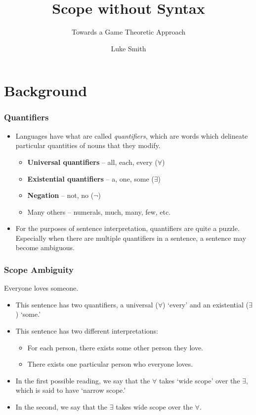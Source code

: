 \documentclass[aspectratio=1610]{beamer}
\title{Scope without Syntax}
\subtitle{Towards a Game Theoretic Approach}
\author{Luke Smith}
\institute{Committee: Robert, MPP, TgB}
\begin{document}

\begin{frame}
\titlepage
\end{frame}

\section{Background}

\begin{frame}
\frametitle{Quantifiers}\pause
\begin{itemize}
\item Languages have what are called \emph{quantifiers}, which are words which delineate particular quantities of nouns that they modify.\pause
\begin{itemize}
\item \textbf{Universal quantifiers} -- all, each, every ($\forall$)\pause
\item \textbf{Existential quantifiers} -- a, one, some ($\exists$)\pause
\item \textbf{Negation} -- not, no ($\neg$)\pause
\item Many others -- numerals, much, many, few, etc.\pause
\end{itemize}

\item For the purposes of sentence interpretation, quantifiers are quite a puzzle. Especially when there are multiple quantifiers in a sentence, a sentence may become ambiguous.
\end{itemize}

\end{frame}

\begin{frame}
\frametitle{Scope Ambiguity}\pause
\begin{exe}
\ex Everyone loves someone.
\end{exe}\pause
\begin{itemize}
\item This sentence has two quantifiers, a universal ($\forall$) `every' and an existential ($\exists$) `some.'\pause
\item This sentence has two different interpretations:\pause
\begin{itemize}
\item For each person, there exists some other person  they love.\pause
\item There exists one particular person who everyone loves.\pause
\end{itemize}
\item In the first possible reading, we say that the $\forall$ takes `wide scope' over the $\exists$, which is said to have `narrow scope.'\pause

\item In the second, we say that the $\exists$ takes wide scope over the $\forall$.
\end{itemize}
\end{frame}
\end{document}
